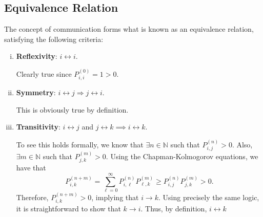 \subsection*{Equivalence Relation}
\begin{Regular}
    The concept of communication forms what is known as an equivalence relation, satisfying the
    following criteria:
    \begin{enumerate}[(i)]
        \item \textbf{Reflexivity}: $i \leftrightarrow i $.

              Clearly true since $P_{i, i}^{(0)}=1>0$.
        \item \textbf{Symmetry}: $i \leftrightarrow j \Longrightarrow j \leftrightarrow i$.

              This is obviously true by definition.

        \item \textbf{Transitivity}: $i \leftrightarrow j$ and $j \leftrightarrow k \implies i \leftrightarrow k$.

              To see this holds formally, we know that $\exists n \in \mathbb{N}$ such that $P_{i, j}^{(n)}>0$. Also, $\exists m \in \mathbb{N}$ such that $P_{j, k}^{(m)}>0$. Using the Chapman-Kolmogorov equations, we have that
              \[
                  P_{i, k}^{(n+m)}=\sum_{\ell=0}^{\infty} P_{i, \ell}^{(n)} P_{\ell, k}^{(m)} \geq P_{i, j}^{(n)} P_{j, k}^{(m)}>0.
              \]
              Therefore, $P_{i, k}^{(n+m)}>0$, implying that $i \to k$. Using precisely the same logic, it is straightforward to show that $k \to i$. Thus, by definition, $i \leftrightarrow k$
    \end{enumerate}
\end{Regular}
